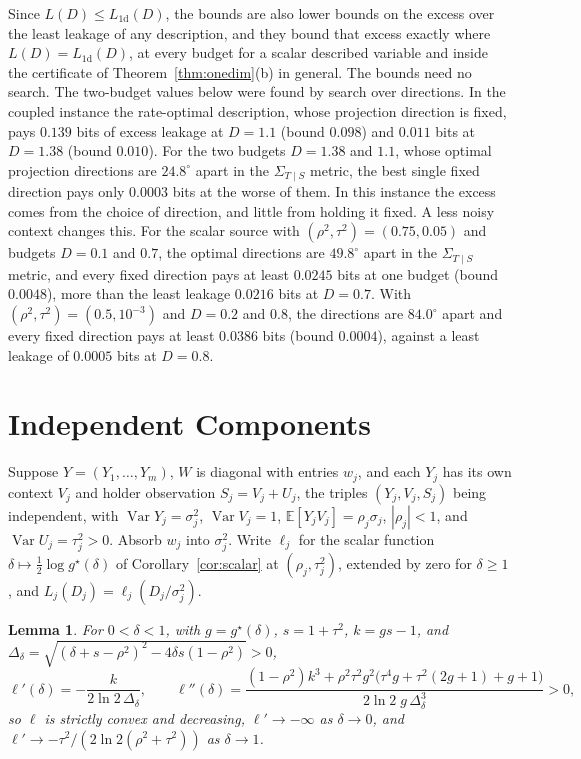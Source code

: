 \documentclass[11pt,onecolumn]{IEEEtran}
\newtheorem{lemma}[theorem]{Lemma}
\newcommand{\E}{\mathbb{E}}
\newcommand{\Var}{\operatorname{Var}}
\newcommand{\Kc}{\Sigma_{T\mid S}}
\begin{document}
Since $L(D)\le L_{\mathrm{1d}}(D)$, the bounds are also lower bounds on
the excess over the least leakage of any description, and they bound
that excess exactly where $L(D)=L_{\mathrm{1d}}(D)$, at every budget for a
scalar described variable and inside the certificate of
Theorem~\ref{thm:onedim}(b) in general. The bounds need no search. The
two-budget values below were found by search over directions. In the
coupled instance the rate-optimal description, whose projection
direction is fixed, pays $0.139$ bits of excess leakage at $D=1.1$
(bound $0.098$) and $0.011$ bits at $D=1.38$ (bound $0.010$). For the
two budgets $D=1.38$ and $1.1$, whose optimal projection directions are
$24.8^\circ$ apart in the $\Kc$ metric, the best single fixed direction
pays only $0.0003$ bits at the worse of them. In this instance the
excess comes from the choice of direction, and little from holding it
fixed. A less noisy context changes this. For the scalar source with
$(\rho^2,\tau^2)=(0.75,0.05)$ and budgets $D=0.1$ and $0.7$, the optimal
directions are $49.8^\circ$ apart in the $\Kc$ metric, and every fixed
direction pays at least $0.0245$ bits at one budget (bound $0.0048$),
more than the least leakage $0.0216$ bits at $D=0.7$. With
$(\rho^2,\tau^2)=(0.5,10^{-3})$ and $D=0.2$ and $0.8$, the directions are
$84.0^\circ$ apart and every fixed direction pays at least $0.0386$
bits (bound $0.0004$), against a least leakage of $0.0005$ bits at
$D=0.8$.

\section{Independent Components}
\label{sec:parallel}

Suppose $Y=(Y_1,\dots,Y_m)$, $W$ is diagonal with entries $w_j$, and each
$Y_j$ has its own context $V_j$ and holder observation $S_j=V_j+U_j$, the
triples $(Y_j,V_j,S_j)$ being independent, with $\Var Y_j=\sigma_j^2$,
$\Var V_j=1$, $\E[Y_jV_j]=\rho_j\sigma_j$, $|\rho_j|<1$, and
$\Var U_j=\tau_j^2>0$. Absorb $w_j$ into $\sigma_j^2$. Write $\ell_j$ for
the scalar function $\delta\mapsto\tfrac12\log g^\star(\delta)$ of
Corollary~\ref{cor:scalar} at $(\rho_j,\tau_j^2)$, extended by zero for
$\delta\ge1$, and $L_j(D_j)=\ell_j(D_j/\sigma_j^2)$.

\begin{lemma}\label{lem:slope}
For $0<\delta<1$, with $g=g^\star(\delta)$, $s=1+\tau^2$, $k=gs-1$, and
$\Delta_\delta=\sqrt{(\delta+s-\rho^2)^2-4\delta s(1-\rho^2)}>0$,
\[
\ell'(\delta)=-\frac{k}{2\ln2\,\Delta_\delta},
\qquad
\ell''(\delta)=\frac{(1-\rho^2)k^3
+\rho^2\tau^2g^2\bigl(\tau^4g+\tau^2(2g+1)+g+1\bigr)}{2\ln2\;g\,\Delta_\delta^3}>0,
\]
so $\ell$ is strictly convex and decreasing, $\ell'\to-\infty$ as
$\delta\to0$, and $\ell'\to-\tau^2/(2\ln2(\rho^2+\tau^2))$ as $\delta\to1$.
\end{lemma}
\end{document}
